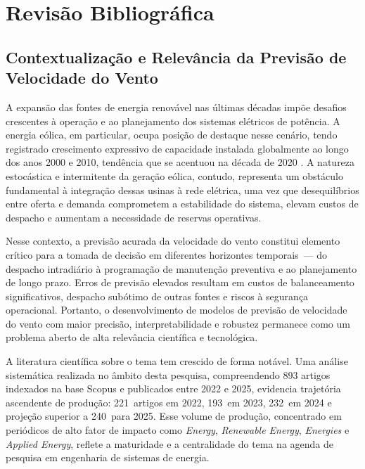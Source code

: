 \chapter{Revisão Bibliográfica}
\label{chapter:rev-bib}

\section{Contextualização e Relevância da Previsão de Velocidade
         do Vento}

A expansão das fontes de energia renovável nas últimas décadas
impõe desafios crescentes à operação e ao planejamento dos sistemas
elétricos de potência. A energia eólica, em particular, ocupa
posição de destaque nesse cenário, tendo registrado crescimento
expressivo de capacidade instalada globalmente ao longo dos anos
2000 e 2010, tendência que se acentuou na década de 2020
\cite{irena2024}. A natureza estocástica e intermitente da geração
eólica, contudo, representa um obstáculo fundamental à integração
dessas usinas à rede elétrica, uma vez que desequilíbrios entre
oferta e demanda comprometem a estabilidade do sistema, elevam
custos de despacho e aumentam a necessidade de reservas operativas.

Nesse contexto, a previsão acurada da velocidade do vento constitui
elemento crítico para a tomada de decisão em diferentes horizontes
temporais~--- do despacho intradiário à programação de manutenção
preventiva e ao planejamento de longo prazo. Erros de previsão
elevados resultam em custos de balanceamento significativos, despacho
subótimo de outras fontes e riscos à segurança operacional. Portanto,
o desenvolvimento de modelos de previsão de velocidade do vento com
maior precisão, interpretabilidade e robustez permanece como um
problema aberto de alta relevância científica e tecnológica.

A literatura científica sobre o tema tem crescido de forma notável.
Uma análise sistemática realizada no âmbito desta pesquisa,
compreendendo 893 artigos indexados na base Scopus e publicados
entre 2022 e 2025, evidencia trajetória ascendente de produção:
221~artigos em 2022, 193~em 2023, 232~em 2024 e projeção superior
a 240~para 2025. Esse volume de produção, concentrado em periódicos
de alto fator de impacto como \textit{Energy}, \textit{Renewable
Energy}, \textit{Energies} e \textit{Applied Energy}, reflete a
maturidade e a centralidade do tema na agenda de pesquisa em
engenharia de sistemas de energia.


